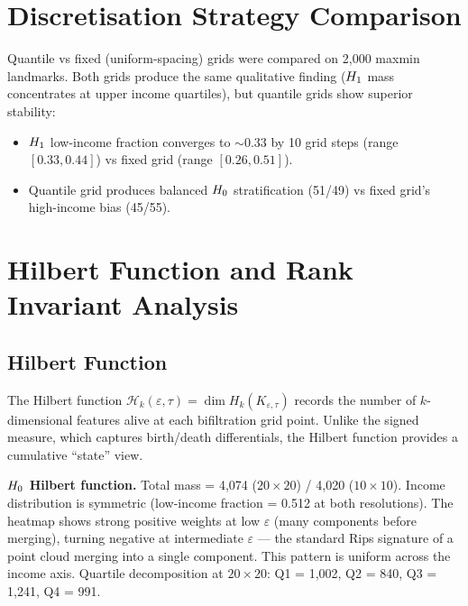 \appendix

\section{Discretisation Strategy Comparison}
\label{app:discretisation}

Quantile vs fixed (uniform-spacing) grids were compared on 2,000 maxmin
landmarks. Both grids produce the same qualitative finding ($H_{1}$ mass
concentrates at upper income quartiles), but quantile grids show superior
stability:

\begin{itemize}
  \item $H_{1}$ low-income fraction converges to ${\sim}0.33$ by 10 grid
    steps (range $[0.33, 0.44]$) vs fixed grid (range $[0.26, 0.51]$).
  \item Quantile grid produces balanced $H_{0}$ stratification (51/49) vs
    fixed grid's high-income bias (45/55).
\end{itemize}

\section{Hilbert Function and Rank Invariant Analysis}
\label{app:hilbert-rank}

\subsection{Hilbert Function}

The Hilbert function $\mathcal{H}_k(\varepsilon, \tau)
= \dim H_k(K_{\varepsilon, \tau})$ records the number of $k$-dimensional
features alive at each bifiltration grid point. Unlike the signed measure,
which captures birth/death differentials, the Hilbert function provides a
cumulative ``state'' view.

\textbf{$H_{0}$ Hilbert function.} Total mass = 4,074 ($20 \times 20$) /
4,020 ($10 \times 10$). Income distribution is symmetric (low-income
fraction = 0.512 at both resolutions). The heatmap shows strong positive
weights at low $\varepsilon$ (many components before merging), turning
negative at intermediate $\varepsilon$ --- the standard Rips signature of a
point cloud merging into a single component. This pattern is uniform across
the income axis. Quartile decomposition at $20 \times 20$:
Q1 = 1,002, Q2 = 840, Q3 = 1,241, Q4 = 991.

